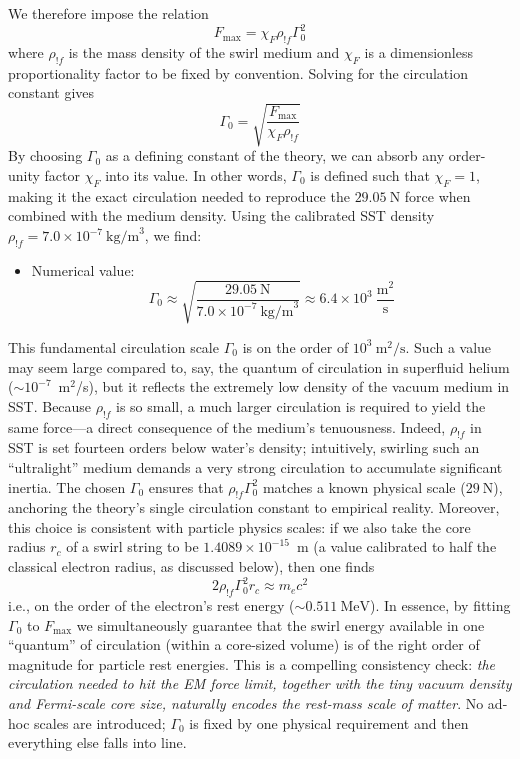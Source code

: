 \documentclass[11pt]{article}
\begin{document}
We therefore impose the relation
    \begin{equation}
    F_{\max} = \chi_F \rho_{!f} \Gamma_0^2
    \end{equation}
where $\rho_{!f}$ is the mass density of the swirl medium and $\chi_F$ is a dimensionless proportionality factor to be fixed by convention. Solving for the circulation constant gives
    \begin{equation}
    \Gamma_0 = \sqrt{\frac{F_{\max}}{\chi_F \rho_{!f}}}
    \end{equation}
    By choosing $\Gamma_0$ as a defining constant of the theory, we can absorb any order-unity factor $\chi_F$ into its value. In other words, $\Gamma_0$ is defined such that $\chi_F=1$, making it the exact circulation needed to reproduce the $29.05~\text{N}$ force when combined with the medium density. Using the calibrated SST density $\rho_{!f} = 7.0\times10^{-7}~\text{kg/m}^3$, we find:
\begin{itemize}
        \item Numerical value:
        \begin{equation}
        \Gamma_0 \approx \sqrt{\frac{29.05~\text{N}}{7.0\times10^{-7}~\text{kg/m}^3}} \approx 6.4\times10^3~\frac{\text{m}^2}{\text{s}}
        \end{equation}
\end{itemize}

    This fundamental circulation scale $\Gamma_0$ is on the order of $10^3~\text{m}^2/\text{s}$. Such a value may seem large compared to, say, the quantum of circulation in superfluid helium ($\sim 10^{-7}$~m$^2$/s), but it reflects the extremely low density of the vacuum medium in SST. Because $\rho_{!f}$ is so small, a much larger circulation is required to yield the same force—a direct consequence of the medium’s tenuousness. Indeed, $\rho_{!f}$ in SST is set fourteen orders below water’s density; intuitively, swirling such an “ultralight” medium demands a very strong circulation to accumulate significant inertia. The chosen $\Gamma_0$ ensures that $\rho_{!f}\Gamma_0^2$ matches a known physical scale ($29~\text{N}$), anchoring the theory’s single circulation constant to empirical reality. Moreover, this choice is consistent with particle physics scales: if we also take the core radius $r_c$ of a swirl string to be $1.4089\times10^{-15}$~m (a value calibrated to half the classical electron radius, as discussed below), then one finds
    \begin{equation}
    2 \rho_{!f} \Gamma_0^2 r_c \approx m_e c^2
    \end{equation}
    i.e., on the order of the electron’s rest energy ($\sim 0.511~\text{MeV}$). In essence, by fitting $\Gamma_0$ to $F_{\max}$ we simultaneously guarantee that the swirl energy available in one “quantum” of circulation (within a core-sized volume) is of the right order of magnitude for particle rest energies. This is a compelling consistency check: \textit{the circulation needed to hit the EM force limit, together with the tiny vacuum density and Fermi-scale core size, naturally encodes the rest-mass scale of matter}. No ad-hoc scales are introduced; $\Gamma_0$ is fixed by one physical requirement and then everything else falls into line.
\end{document}
